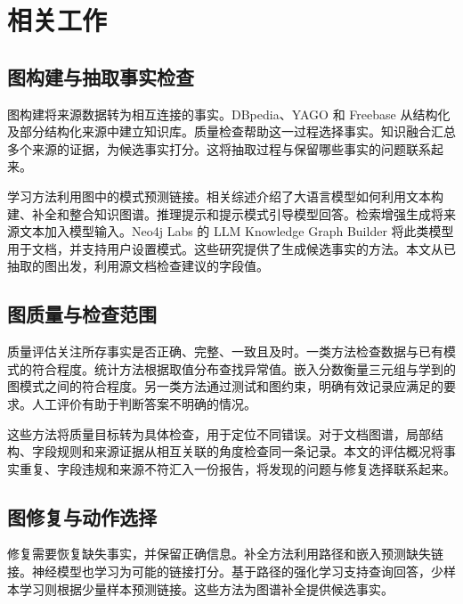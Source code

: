\section{相关工作}
\label{sec:related_work}

\subsection{图构建与抽取事实检查}

图构建将来源数据转为相互连接的事实\citep{ref_ji2021}。DBpedia、YAGO 和 Freebase 从结构化及部分结构化来源中建立知识库\citep{ref_auer2007,ref_suchanek2007,ref_bollacker2008}。质量检查帮助这一过程选择事实。知识融合汇总多个来源的证据，为候选事实打分\citep{ref_dong2014}。这将抽取过程与保留哪些事实的问题联系起来。

学习方法利用图中的模式预测链接\citep{ref_bordes2013,ref_wang2017,ref_schlichtkrull2018}。相关综述介绍了大语言模型如何利用文本构建、补全和整合知识图谱\citep{ref_pan2023,ref_pan2025,ref_bian2025}。推理提示和提示模式引导模型回答\citep{ref_wei2023,ref_white2023}。检索增强生成将来源文本加入模型输入\citep{ref_lewis2020}。Neo4j Labs 的 LLM Knowledge Graph Builder 将此类模型用于文档，并支持用户设置模式\citep{ref_neo4j_llm_graph_builder}。这些研究提供了生成候选事实的方法。本文从已抽取的图出发，利用源文档检查建议的字段值。

\subsection{图质量与检查范围}

质量评估关注所存事实是否正确、完整、一致且及时\citep{ref_zaveri2016,ref_paulheim2017,ref_wang2021}。一类方法检查数据与已有模式的符合程度。统计方法根据取值分布查找异常值\citep{ref_wienand2014,ref_paulheim2014}。嵌入分数衡量三元组与学到的图模式之间的符合程度\citep{ref_nickel2016}。另一类方法通过测试和图约束，明确有效记录应满足的要求\citep{ref_kontokostas2014,ref_shacl2017}。人工评价有助于判断答案不明确的情况\citep{ref_acosta2013}。

这些方法将质量目标转为具体检查，用于定位不同错误。对于文档图谱，局部结构、字段规则和来源证据从相互关联的角度检查同一条记录。本文的评估概况将事实重复、字段违规和来源不符汇入一份报告，将发现的问题与修复选择联系起来。

\subsection{图修复与动作选择}

修复需要恢复缺失事实，并保留正确信息。补全方法利用路径和嵌入预测缺失链接\citep{ref_lao2011,ref_bordes2013,ref_yang2015,ref_shi2017}。神经模型也学习为可能的链接打分\citep{ref_dettmers2018,ref_zhu2021}。基于路径的强化学习支持查询回答\citep{ref_das2018}，少样本学习则根据少量样本预测链接\citep{ref_chen2019}。这些方法为图谱补全提供候选事实。


